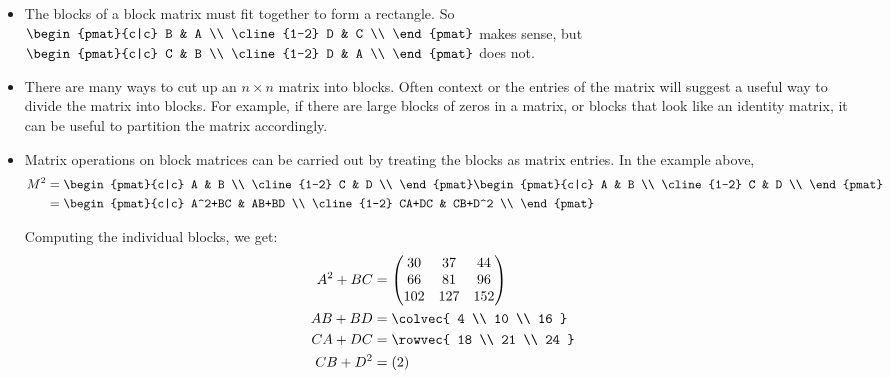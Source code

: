 \begin{itemize}
\item The blocks of a block matrix  must fit together to form a rectangle.  So 
$\begin{pmat}{c|c}
B & A \\
\cline{1-2}
D & C \\
\end{pmat}
$ makes sense, but 
$\begin{pmat}{c|c}
C & B \\
\cline{1-2}
D & A \\
\end{pmat}
$ does not.


\item There are many ways to cut up an $n\times n$ matrix into blocks.  Often context or the entries of the matrix will suggest a useful way to divide the matrix into blocks.  For example, if there are large blocks of zeros in a matrix, or blocks that look like an identity matrix, it can be useful to partition the matrix accordingly.

\item Matrix operations on block matrices can be carried out by treating the blocks as matrix entries.  In the example above,
\begin{align*}
M^2 & = \begin{pmat}{c|c}
A & B \\
\cline{1-2}
C & D \\
\end{pmat}
\begin{pmat}{c|c}
A & B \\
\cline{1-2}
C & D \\
\end{pmat} \\
& = \begin{pmat}{c|c}
A^2+BC & AB+BD \\
\cline{1-2}
CA+DC & CB+D^2 \\
\end{pmat}
\end{align*}

Computing the individual blocks, we get:
\begin{align*}
A^2+BC &=\begin{pmatrix}
	30 & 37 & 44 \\
	66 & 81 & 96 \\
	102&127 &152 \\
	\end{pmatrix} \\
AB+BD  &= \colvec{ 4 \\ 10 \\ 16 } \\
CA+DC  &= \rowvec{ 18 \\ 21 \\ 24 } \\
CB+D^2 &= (2) 
\end{align*}


\end{itemize}
